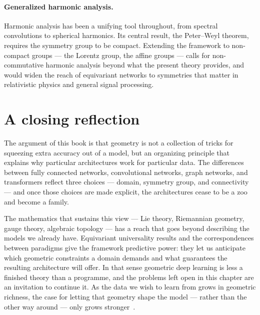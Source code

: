 \paragraph{Generalized harmonic analysis.}
Harmonic analysis has been a unifying tool throughout, from spectral convolutions
to spherical harmonics. Its central result, the Peter--Weyl theorem, requires the
symmetry group to be compact. Extending the framework to non-compact groups ---
the Lorentz group, the affine groups --- calls for non-commutative harmonic
analysis beyond what the present theory provides, and would widen the reach of
equivariant networks to symmetries that matter in relativistic physics and
general signal processing.

\section{A closing reflection}
\label{sec:concl:reflection}

The argument of this book is that geometry is not a collection of tricks for
squeezing extra accuracy out of a model, but an organizing principle that
explains why particular architectures work for particular data. The differences
between fully connected networks, convolutional networks, graph networks, and
transformers reflect three choices --- domain, symmetry group, and connectivity
--- and once those choices are made explicit, the architectures cease to be a
zoo and become a family.

The mathematics that sustains this view --- Lie theory, Riemannian geometry,
gauge theory, algebraic topology --- has a reach that goes beyond describing the
models we already have. Equivariant universality results and the correspondences
between paradigms give the framework predictive power: they let us anticipate
which geometric constraints a domain demands and what guarantees the resulting
architecture will offer. In that sense geometric deep learning is less a finished
theory than a programme, and the problems left open in this chapter are an
invitation to continue it. As the data we wish to learn from grows in geometric
richness, the case for letting that geometry shape the model --- rather than the
other way around --- only grows stronger~\citep{bronstein2021geometric}.
